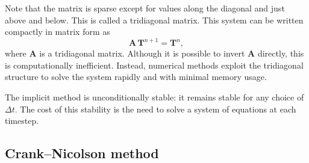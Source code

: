 Note that the matrix is sparse except for values along the diagonal and just above and below.  This is called a tridiagonal matrix.  This system can be written compactly in matrix form as
\[
    \mathbf{A}\,\mathbf{T}^{n+1} = \mathbf{T}^n,
\]
where $\mathbf{A}$ is a tridiagonal matrix. Although it is possible to invert $\mathbf{A}$ directly, this is computationally inefficient. Instead, numerical methods exploit the tridiagonal structure to solve the system rapidly and with minimal memory usage.

The implicit method is unconditionally stable: it remains stable for any choice of $\Delta t$. The cost of this stability is the need to solve a system of equations at each timestep.

\subsection{Crank--Nicolson method}

